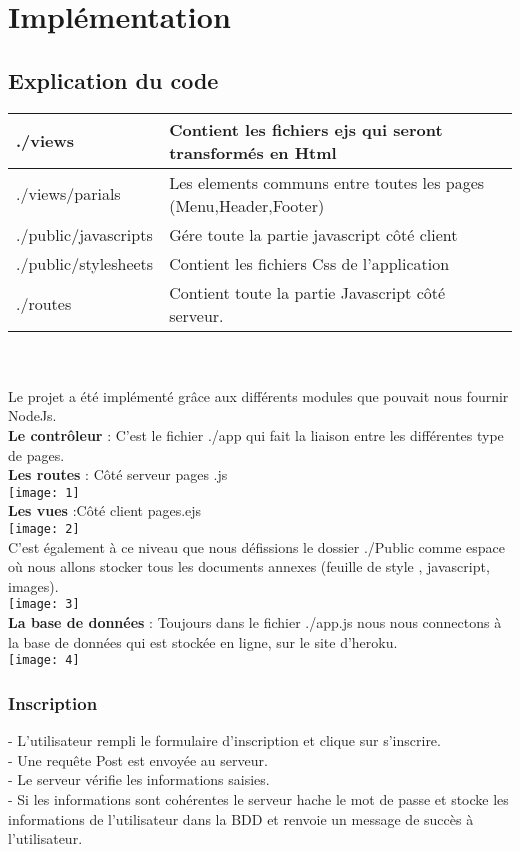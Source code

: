\documentclass{article}
\begin{document}
\section{Implémentation}
\subsection{Explication du code}
\begin{tabular}{ | l | l | }
 \hline
 ./views & Contient les fichiers ejs qui seront transformés en Html \\ 
  \hline
  ./views/parials & Les elements communs entre toutes les pages (Menu,Header,Footer) \\ 
  \hline
 ./public/javascripts & Gére toute la partie javascript côté client  \\  
  \hline
 ./public/stylesheets & Contient les fichiers Css de l'application \\
  \hline
 ./routes & Contient toute la partie Javascript côté serveur.\\
  \hline
\end{tabular}
\\ \\
 Le projet a été implémenté grâce aux différents modules que pouvait nous fournir NodeJs. \\
 \textbf{Le contrôleur} :
 C’est le fichier ./app qui fait la liaison entre les différentes type de pages. \\
\textbf{Les routes} : Côté serveur  pages .js \\
\texttt{[image: 1]} \\
\textbf{Les vues} :Côté client  pages.ejs \\
\texttt{[image: 2]} \\
C’est également à ce niveau que nous défissions le dossier ./Public comme espace où nous allons stocker tous les documents annexes (feuille de style , javascript, images). \\
\texttt{[image: 3]} \\
\textbf{La base de données} : Toujours dans le fichier ./app.js  nous nous connectons à la base de données qui est stockée en ligne, sur le site d’heroku. \\
\texttt{[image: 4]} \\
\subsubsection{Inscription}
- L'utilisateur rempli le formulaire d'inscription et clique sur s'inscrire. \\
- Une requête Post est envoyée au serveur.\\
- Le serveur vérifie les informations saisies. \\
- Si les informations sont cohérentes le serveur hache le mot de passe et stocke les informations de l'utilisateur dans la BDD et renvoie un message de succès à l'utilisateur. \\
\end{document}

